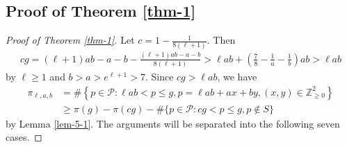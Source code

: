 \documentclass[12pt,a4paper,reqno]{amsart}
\numberwithin{equation}{section}
\def\Z{{\mathbb Z}}
\def\cP{{\mathcal P}}
\theoremstyle{plain}
\theoremstyle{definition}
\begin{document}
 \subsection{Proof of Theorem \ref{thm-1}}
\begin{proof}[Proof of Theorem \ref{thm-1}]
	Let $c= 1-\frac{1}{8(\ell+1)}$. Then 
	\begin{align*}
		cg
		=(\ell+1)ab-a-b-\frac{(\ell+1) ab-a-b}{8(\ell+1)}
		>\ell ab +\left(\frac{7}{8}-\frac{1}{a}-\frac{1}{b}\right)ab>\ell ab
	\end{align*}
	by $\ell\geq 1$ and $b>a>e^{\ell+1}>7.$
	Since $cg>\ell ab$, we have
	\begin{align}\label{ineq-1}
		\pi_{\ell,a,b}
		&=\#\left\{p\in \cP: \ell ab<p\leq g, p=\ell ab+ax+by,(x,y)\in\Z_{\geq 0}^{2}\right\}\nonumber\\
		&\geq \pi(g)-\pi(cg)-\#\{p\in\cP: cg< p\leq g, p\notin S\}
	\end{align}
	by Lemma \ref{lem-5-1}. The arguments will be separated into the following seven cases.
	

\end{proof}
\end{document}
